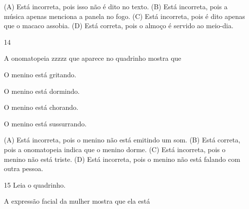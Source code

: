 
(A) Está incorreta, pois isso não é dito no texto.
(B) Está incorreta, pois a música apenas menciona a panela no fogo.
(C) Está incorreta, pois é dito apenas que o macaco assobia.
(D) Está correta, pois o almoço é servido ao meio-dia.

\num{14}


A onomatopeia zzzzz que aparece no quadrinho mostra que

\begin{minipage}{.5\textwidth}
\begin{escolha}
\item O menino está gritando.

\item O menino está dormindo.

\item O menino está chorando.

\item O menino está sussurrando.
\end{escolha}
\end{minipage}

(A) Está incorreta, pois o menino não está emitindo um som.
(B) Está correta, pois a onomatopeia indica que o menino dorme.
(C) Está incorreta, pois o menino não está triste.
(D) Está incorreta, pois o menino não está falando com outra pessoa.

\num{15} Leia o quadrinho.


A expressão facial da mulher mostra que ela está

